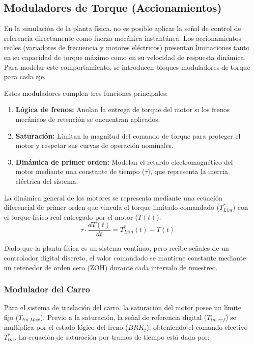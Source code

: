\documentclass[11pt]{article}                                    %
\begin{document}
\subsection{Moduladores de Torque (Accionamientos)}
En la simulación de la planta física, no es posible aplicar la señal de control de referencia directamente como fuerza mecánica instantánea. Los accionamientos reales (variadores de frecuencia y motores eléctricos) presentan limitaciones tanto en su capacidad de torque máximo como en su velocidad de respuesta dinámica. Para modelar este comportamiento, se introducen bloques moduladores de torque para cada eje.

Estos moduladores cumplen tres funciones principales:
\begin{enumerate}
    \item \textbf{Lógica de frenos:} Anulan la entrega de torque del motor si los frenos mecánicos de retención se encuentran aplicados.
    \item \textbf{Saturación:} Limitan la magnitud del comando de torque para proteger el motor y respetar sus curvas de operación nominales.
    \item \textbf{Dinámica de primer orden:} Modelan el retardo electromagnético del motor mediante una constante de tiempo ($\tau$), que representa la inercia eléctrica del sistema.
\end{enumerate}

La dinámica general de los motores se representa mediante una ecuación diferencial de primer orden que vincula el torque limitado comandado ($T_{Lim}^*$) con el torque físico real entregado por el motor ($T(t)$):
$$\tau \cdot \frac{dT(t)}{dt} = T_{Lim}^*(t) - T(t)$$

Dado que la planta física es un sistema continuo, pero recibe señales de un controlador digital discreto, el valor comandado se mantiene constante mediante un retenedor de orden cero (ZOH) durante cada intervalo de muestreo.

\subsubsection{Modulador del Carro}
Para el sistema de traslación del carro, la saturación del motor posee un límite fijo ($T_{tm\_Max}$). Previo a la saturación, la señal de referencia digital ($T_{tm\_ref}$) se multiplica por el estado lógico del freno ($BRK_t$), obteniendo el comando efectivo $T_{tm}^*$. La ecuación de saturación por tramos de tiempo está dada por:
\end{document}
